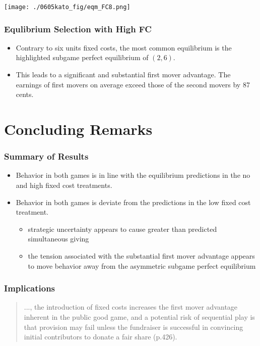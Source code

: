 \documentclass[unicode,12pt]{beamer}
\begin{document}
    \begin{frame}
        \frametitle{}
    
        \centerline{\texttt{[image: ./0605kato\_fig/eqm\_FC8.png]}}
            
    \end{frame}

    \begin{frame}
        \frametitle{Equlibrium Selection with High FC}
    
        \begin{itemize}
            \item Contrary to six units fixed costs, the most common equilibrium is the highlighted subgame perfect equilibrium of $(2,6)$.
            \item This leads to a significant and substantial first mover advantage. The earnings of first movers on average exceed those of the second movers by 87 cents. 
        \end{itemize}
    
    \end{frame}

    \section{Concluding Remarks}

    \begin{frame}
        \frametitle{Summary of Results}
    
        \begin{itemize}
            \item Behavior in both games is in line with the equilibrium predictions in the no and high fixed cost treatments.
            \item Behavior in both games is deviate from the predictions in the low fixed cost treatment.
            \begin{itemize}
                \item strategic uncertainty appears to cause greater than predicted simultaneous giving
                \item the tension associated with the substantial first mover advantage appears to move behavior away from the asymmetric subgame perfect equilibrium
            \end{itemize}
        \end{itemize}
    
    \end{frame}

    \begin{frame}
        \frametitle{Implications}
    
        \begin{quote}
            ..., the introduction of fixed costs increases the first mover advantage inherent in the public good game, and a potential risk of sequential play is that provision may fail unless the fundraiser is successful in convincing initial contributors to donate a fair share (p.426).
        \end{quote}
    
    \end{frame}
\end{document}
